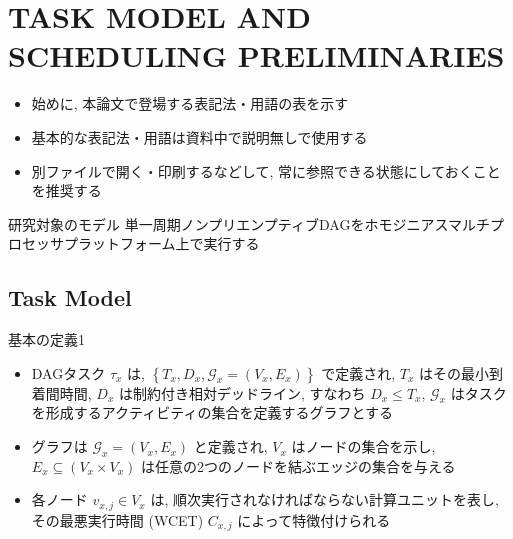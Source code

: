 
\section{TASK MODEL AND SCHEDULING PRELIMINARIES}
\label{sec: t}

\begin{frame}{}
    \begin{itemize}
        \item 始めに, 本論文で登場する表記法・用語の表を示す
        \item 基本的な表記法・用語は資料中で説明無しで使用する
        \item 別ファイルで開く・印刷するなどして, 常に参照できる状態にしておくことを推奨する
    \end{itemize}
\end{frame}



\begin{frame}{研究対象のモデル}
    単一周期ノンプリエンプティブDAGをホモジニアスマルチプロセッサプラットフォーム上で実行する
\end{frame}

\subsection{Task Model}
\label{ssec: ta}

\begin{frame}{基本の定義1}
    \begin{itemize}
        \item DAGタスク $\tau_{x}$ は, $\left\{T_{x}, D_{x}, \mathcal{G}_{x}=\left(V_{x}, E_{x}\right)\right\}$ で定義され, $T_{x}$ はその最小到着間時間, $D_{x}$ は制約付き相対デッドライン, すなわち $D_{x} \leq T_{x}$, $\mathcal{G}_{x}$ はタスクを形成するアクティビティの集合を定義するグラフとする
        \item グラフは $\mathcal{G}_{x}=\left(V_{x}, E_{x}\right)$ と定義され, $V_{x}$ はノードの集合を示し, $E_{x} \subseteq\left(V_{x} \times V_{x}\right)$ は任意の2つのノードを結ぶエッジの集合を与える
        \item 各ノード $v_{x, j} \in V_{x}$ は, 順次実行されなければならない計算ユニットを表し, その最悪実行時間 (WCET)  $C_{x, j}$ によって特徴付けられる
    \end{itemize}
\end{frame}

